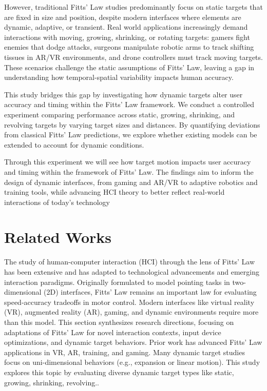 \documentclass[acmlarge]{acmart}
\begin{document}
However, traditional Fitts’ Law studies predominantly focus on static targets that are fixed in size and position, despite modern interfaces where elements are dynamic, adaptive, or transient. Real world applications increasingly demand interactions with moving, growing, shrinking, or rotating targets: gamers fight enemies that dodge attacks, surgeons manipulate robotic arms to track shifting tissues in AR/VR environments, and drone controllers must track moving targets. These scenarios challenge the static assumptions of Fitts’ Law, leaving a gap in understanding how temporal-spatial variability impacts human accuracy.

This study bridges this gap by investigating how dynamic targets alter user accuracy and timing within the Fitts’ Law framework. We conduct a controlled experiment comparing performance across static, growing, shrinking, and revolving targets by varying target sizes and distances. By quantifying deviations from classical Fitts’ Law predictions, we explore whether existing models can be extended to account for dynamic conditions.

Through this experiment we will see how target motion impacts user accuracy and timing within the framework of Fitts’ Law. The findings aim to inform the design of dynamic interfaces, from gaming and AR/VR to adaptive robotics and training tools, while advancing HCI theory to better reflect real-world interactions of today’s technology

\section{Related Works}
The study of human-computer interaction (HCI) through the lens of Fitts’ Law has been extensive and has adapted to technological advancements and emerging interaction paradigms. Originally formulated to model pointing tasks in two-dimensional (2D) interfaces, Fitts’ Law remains an important law for evaluating speed-accuracy tradeoffs in motor control. Modern interfaces like virtual reality (VR), augmented reality (AR), gaming, and dynamic environments require more than this model. This section synthesizes research directions, focusing on adaptations of Fitts’ Law for novel interaction contexts, input device optimizations, and dynamic target behaviors. Prior work has advanced Fitts’ Law applications in VR, AR, training, and gaming. Many dynamic target studies focus on uni-dimensional behaviors (e.g., expansion or linear motion). This study explores this topic by evaluating diverse dynamic target types like static, growing, shrinking, revolving..
\end{document}
